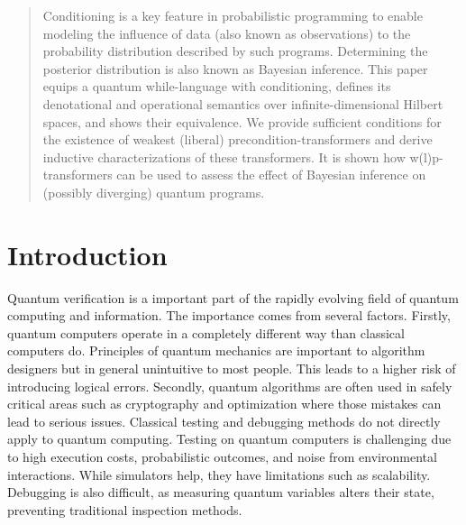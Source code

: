 \documentclass[a4paper,UKenglish,cleveref, autoref, thm-restate]{lipics-v2021}
\begin{document}
\newcommand*{\fracTr}{\hat{tr}}
\newcommand*{\df}{:=}

\newcommand*{\identityOp}{\textbf{I}}
\newcommand*{\identityOpVar}[1]{\identityOp_{#1}}
\newcommand*{\zeroOp}{\mathbf{0}}
\newcommand*{\zeroOpVar}[1]{\zeroOp_{#1}}

\newcommand*{\varSet}{\mathit{Var}}
\newcommand*{\ext}{\mathit{span}}

\newcommand*{\multdot}{\cdot}
\newcommand*{\plusdot}{+}

\clearpage{}

\maketitle

\begin{abstract}
    Conditioning is a key feature in probabilistic programming to enable modeling the influence of data (also known as observations) to the probability distribution described by such programs. Determining the posterior distribution is also known as Bayesian inference. This paper equips a quantum while-language with conditioning, defines its denotational and operational semantics over infinite-dimensional Hilbert spaces, and shows their equivalence. We provide sufficient conditions for the existence of weakest (liberal) precondition-transformers and derive inductive characterizations of these transformers. It is shown how w(l)p-transformers can be used to assess the effect of Bayesian inference on (possibly diverging) quantum programs.
\end{abstract}
\tableofcontents
\section{Introduction}
\label{sec:introduction}
Quantum verification is a important part of the rapidly evolving field of quantum computing and information. The importance comes from several factors. Firstly, quantum computers operate in a completely different way than classical computers do. Principles of quantum mechanics are important to algorithm designers but in general unintuitive to most people. This leads to a higher risk of introducing logical errors. Secondly, quantum algorithms are often used in safely critical areas such as cryptography and optimization where those mistakes can lead to serious issues.
Classical testing and debugging methods do not directly apply to quantum computing. Testing on quantum computers is challenging due to high execution costs, probabilistic outcomes, and noise from environmental interactions. While simulators help, they have limitations such as scalability. Debugging is also difficult, as measuring quantum variables alters their state, preventing traditional inspection methods.
\end{document}
